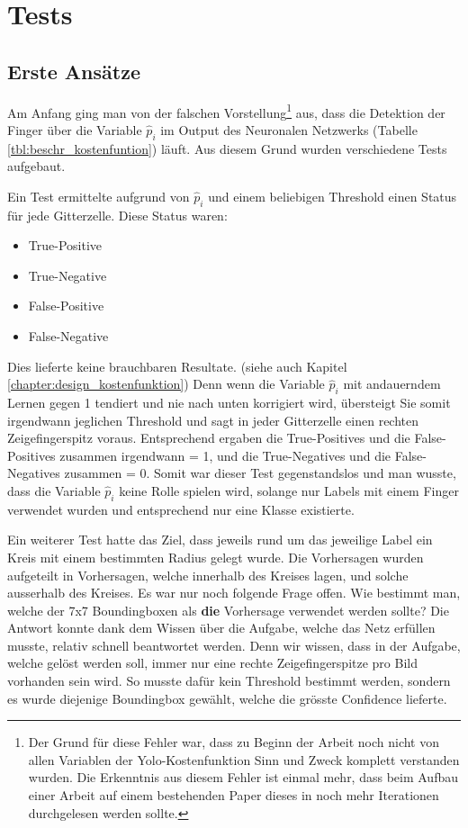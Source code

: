 \newpage
\section{Tests} 
\label{chapter:tests}
\subsection{Erste Ansätze}
Am Anfang ging man von der falschen Vorstellung\footnote{\label{grund_falscher_test}Der Grund für diese Fehler war, dass zu Beginn der Arbeit noch nicht von allen Variablen der Yolo-Kostenfunktion Sinn und Zweck komplett verstanden wurden. Die Erkenntnis aus diesem Fehler ist einmal mehr, dass beim Aufbau einer Arbeit auf einem bestehenden Paper dieses in noch mehr Iterationen durchgelesen werden sollte.} aus, dass die Detektion der Finger über die Variable $\hat{p}_i$ im Output des Neuronalen Netzwerks (Tabelle \ref{tbl:beschr_kostenfuntion}) läuft. 
Aus diesem Grund wurden verschiedene Tests aufgebaut.

Ein Test ermittelte aufgrund von $\hat{p}_i$ und einem beliebigen Threshold einen Status für jede Gitterzelle. Diese Status waren: 

\begin{itemize}
\item \grqq{}True-Positive\grqq{}
\item \grqq{}True-Negative\grqq{}
\item \grqq{}False-Positive\grqq{}
\item \grqq{}False-Negative\grqq{}
\end{itemize}

Dies lieferte keine brauchbaren Resultate. (siehe auch Kapitel \ref{chapter:design_kostenfunktion})
Denn wenn die Variable $\hat{p}_i$ mit andauerndem Lernen gegen 1 tendiert und nie nach unten korrigiert wird, übersteigt Sie somit irgendwann jeglichen Threshold und sagt in jeder Gitterzelle einen rechten Zeigefingerspitz voraus. 
Entsprechend ergaben die \grqq{}True-Positives\grqq{} und die \grqq{}False-Positives\grqq{} zusammen irgendwann = 1, und die \grqq{}True-Negatives\grqq{} und die \grqq{}False-Negatives\grqq{} zusammen = 0.
Somit war dieser Test gegenstandslos und man wusste, dass die Variable $\hat{p}_i$ keine Rolle spielen wird, solange nur Labels mit einem Finger verwendet wurden und entsprechend nur eine Klasse existierte.

Ein weiterer Test hatte das Ziel, dass jeweils rund um das jeweilige Label ein Kreis mit einem bestimmten Radius gelegt wurde.
Die Vorhersagen wurden aufgeteilt in Vorhersagen, welche innerhalb des Kreises lagen, und solche ausserhalb des Kreises.
Es war nur noch folgende Frage offen. 
Wie bestimmt man, welche der 7x7 Boundingboxen als \textbf{die} Vorhersage verwendet werden sollte?
Die Antwort konnte dank dem Wissen über die Aufgabe, welche das Netz erfüllen musste, relativ schnell beantwortet werden.
Denn wir wissen, dass in der Aufgabe, welche gelöst werden soll, immer nur eine rechte Zeigefingerspitze pro Bild vorhanden sein wird.
So musste dafür kein Threshold bestimmt werden, sondern es wurde diejenige Boundingbox gewählt, welche die grösste Confidence lieferte.

